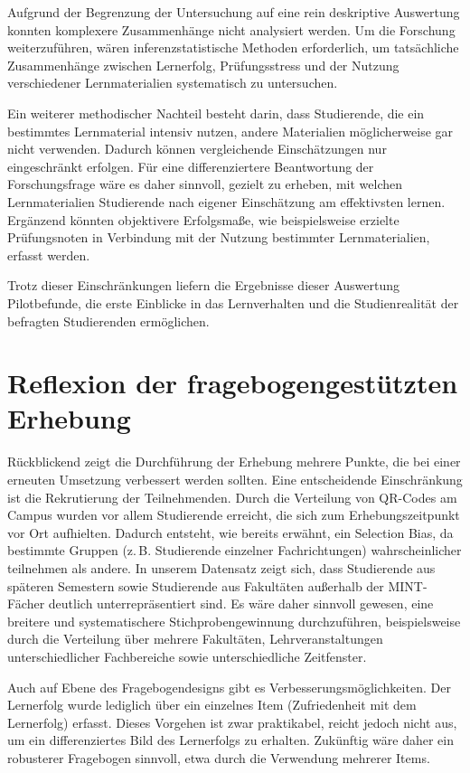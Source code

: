 \documentclass[a4paper,12pt]{article}
\begin{document}
Aufgrund der Begrenzung der Untersuchung auf eine rein deskriptive Auswertung konnten komplexere Zusammenhänge nicht analysiert werden. Um die Forschung weiterzuführen, wären inferenzstatistische Methoden erforderlich, um tatsächliche Zusammenhänge zwischen Lernerfolg, Prüfungsstress und der Nutzung verschiedener Lernmaterialien systematisch zu untersuchen.

Ein weiterer methodischer Nachteil besteht darin, dass Studierende, die ein bestimmtes Lernmaterial intensiv nutzen, andere Materialien möglicherweise gar nicht verwenden. Dadurch können vergleichende Einschätzungen nur eingeschränkt erfolgen. Für eine differenziertere Beantwortung der Forschungsfrage wäre es daher sinnvoll, gezielt zu erheben, mit welchen Lernmaterialien Studierende nach eigener Einschätzung am effektivsten lernen. Ergänzend könnten objektivere Erfolgsmaße, wie beispielsweise erzielte Prüfungsnoten in Verbindung mit der Nutzung bestimmter Lernmaterialien, erfasst werden.

Trotz dieser Einschränkungen liefern die Ergebnisse dieser Auswertung Pilotbefunde, die erste Einblicke in das Lernverhalten und die Studienrealität der befragten Studierenden ermöglichen.

\section{Reflexion der fragebogengestützten Erhebung}

Rückblickend zeigt die Durchführung der Erhebung mehrere Punkte, die bei einer erneuten Umsetzung verbessert werden sollten. Eine entscheidende Einschränkung ist die Rekrutierung der Teilnehmenden. Durch die Verteilung von QR-Codes am Campus wurden vor allem Studierende erreicht, die sich zum Erhebungszeitpunkt vor Ort aufhielten. Dadurch entsteht, wie bereits erwähnt, ein Selection Bias, da bestimmte Gruppen (z.\,B. Studierende einzelner Fachrichtungen) wahrscheinlicher teilnehmen als andere. In unserem Datensatz zeigt sich, dass Studierende aus späteren Semestern sowie Studierende aus Fakultäten außerhalb der MINT-Fächer deutlich unterrepräsentiert sind. Es wäre daher sinnvoll gewesen, eine breitere und systematischere Stichprobengewinnung durchzuführen, beispielsweise durch die Verteilung über mehrere Fakultäten, Lehrveranstaltungen unterschiedlicher Fachbereiche sowie unterschiedliche Zeitfenster.

Auch auf Ebene des Fragebogendesigns gibt es Verbesserungsmöglichkeiten. Der Lernerfolg wurde lediglich über ein einzelnes Item (Zufriedenheit mit dem Lernerfolg) erfasst. Dieses Vorgehen ist zwar praktikabel, reicht jedoch nicht aus, um ein differenziertes Bild des Lernerfolgs zu erhalten. Zukünftig wäre daher ein robusterer Fragebogen sinnvoll, etwa durch die Verwendung mehrerer Items.
\end{document}
